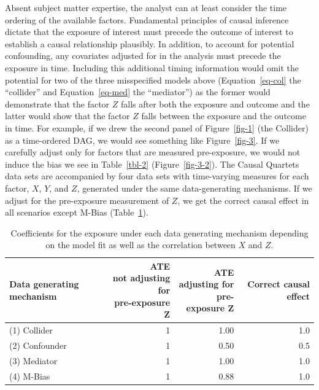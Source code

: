 \documentclass[
  letterpaper,
  DIV=11,
  numbers=noendperiod]{scrartcl}
\begin{document}
Absent subject matter expertise, the analyst can at least consider the
time ordering of the available factors. Fundamental principles of causal
inference dictate that the exposure of interest must precede the outcome
of interest to establish a causal relationship plausibly. In addition,
to account for potential confounding, any covariates adjusted for in the
analysis must precede the exposure in time. Including this additional
timing information would omit the potential for two of the three
misspecified models above (Equation~\ref{eq-col} the ``collider'' and
Equation~\ref{eq-med} the ``mediator'') as the former would demonstrate
that the factor \(Z\) falls after both the exposure and outcome and the
latter would show that the factor \(Z\) falls between the exposure and
the outcome in time. For example, if we drew the second panel of
Figure~\ref{fig-1} (the Collider) as a time-ordered DAG, we would see
something like Figure~\ref{fig-3}. If we carefully adjust only for
factors that are measured pre-exposure, we would not induce the bias we
see in Table~\ref{tbl-2} (Figure~\ref{fig-3-2}). The Causal Quartets
data sets are accompanied by four data sets with time-varying measures
for each factor, \(X\), \(Y\), and \(Z\), generated under the same
data-generating mechanisms. If we adjust for the pre-exposure
measurement of \(Z\), we get the correct causal effect in all scenarios
except M-Bias (Table~\ref{tbl-3}).

\hypertarget{tbl-3}{}
\begin{table}
\caption{\label{tbl-3}Coefficients for the exposure under each data generating mechanism
depending on the model fit as well as the correlation between \(X\) and
\(Z\). }\tabularnewline

\centering
\begin{tabular}{lrrr}
\toprule
Data generating mechanism & \makecell[c]{ATE\\not adjusting for\\pre-exposure Z} & \makecell[c]{ATE\\adjusting for\\pre-exposure Z} & Correct causal effect\\
\midrule
(1) Collider & 1 & 1.00 & 1.0\\
(2) Confounder & 1 & 0.50 & 0.5\\
(3) Mediator & 1 & 1.00 & 1.0\\
(4) M-Bias & 1 & 0.88 & 1.0\\
\bottomrule
\end{tabular}
\end{table}
\end{document}
